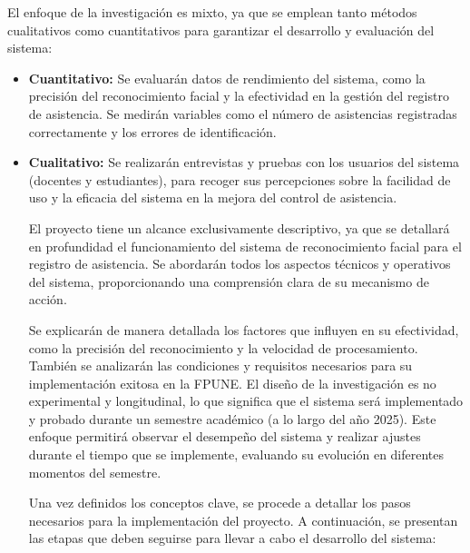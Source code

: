 El enfoque de la investigación es mixto, ya que se emplean tanto métodos cualitativos como cuantitativos para garantizar el desarrollo y evaluación del sistema:
\begin{itemize}
\item \textbf{Cuantitativo:} Se evaluarán datos de rendimiento del sistema, como la precisión del reconocimiento facial y la efectividad en la gestión del registro de asistencia. Se medirán variables como el número de asistencias registradas correctamente y los errores de identificación.
\item \textbf{Cualitativo:} Se realizarán entrevistas y pruebas con los usuarios del sistema (docentes y estudiantes), para recoger sus percepciones sobre la facilidad de uso y la eficacia del sistema en la mejora del control de asistencia.

El proyecto tiene un alcance exclusivamente descriptivo, ya que se detallará en profundidad el funcionamiento del sistema de reconocimiento facial para el registro de asistencia. Se abordarán todos los aspectos técnicos y operativos del sistema, proporcionando una comprensión clara de su mecanismo de acción.

Se explicarán de manera detallada los factores que influyen en su efectividad, como la precisión del reconocimiento y la velocidad de procesamiento. También se analizarán las condiciones y requisitos necesarios para su implementación exitosa en la FPUNE. El diseño de la investigación es no experimental y longitudinal, lo que significa que el sistema será implementado y probado durante un semestre académico (a lo largo del año 2025). Este enfoque permitirá observar el desempeño del sistema y realizar ajustes durante el tiempo que se implemente, evaluando su evolución en diferentes momentos del semestre.

Una vez definidos los conceptos clave, se procede a detallar los pasos necesarios para la implementación del proyecto. A continuación, se presentan las etapas que deben seguirse para llevar a cabo el desarrollo del sistema:
\end{itemize}

